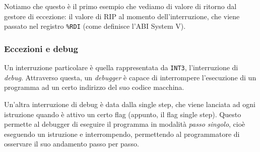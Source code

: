 \documentclass[a4paper,11pt]{article}
\begin{document}
Notiamo che questo è il primo esempio che vediamo di valore di ritorno dal gestore di eccezione: il valore di RIP al momento dell'interruzione, che viene passato nel registro \lstinline|%RDI| (come definisce l'ABI System V).

\subsubsection{Eccezioni e debug}
Un interruzione particolare è quella rappresentata da \lstinline|INT3|, l'interruzione di \textit{debug}.
Attraverso questa, un \textit{debugger} è capace di interrompere l'esecuzione di un programma ad un certo indirizzo del suo codice macchina.

Un'altra interruzione di debug è data dalla single step, che viene lanciata ad ogni istruzione quando è attivo un certo flag (appunto, il flag single step). Questo permette al debugger di eseguire il programma in modalità \textit{passo singolo}, cioè eseguendo un istruzione e interrompendo, permettendo al programmatore di osservare il suo andamento passo per passo.

\par\smallskip
\end{document}
